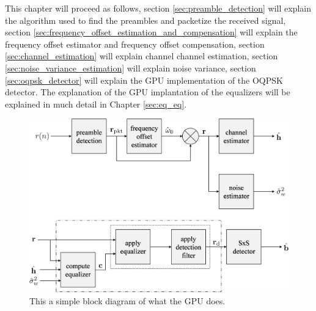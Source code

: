 This chapter will proceed as follows, 
section \ref{sec:preamble_detection} will explain the algorithm used to find the preambles and packetize the received signal,
section \ref{sec:frequency_offset_estimation_and_compensation} will explain the frequency offset estimator and frequency offset compensation,
section \ref{sec:channel_estimation} will explain channel channel estimation,
section \ref{sec:noise_variance_estimation} will explain noise variance,
section \ref{sec:oqpsk_detector} will explain the GPU implementation of the OQPSK detector.
The explanation of the GPU implantation of the equalizers will be explained in much detail in Chapter \ref{sec:eq_eq}.
\begin{figure}
	\centering\includegraphics[width=6in]{figures/systemOverview/blockDiagram.pdf}
	\caption{This a simple block diagram of what the GPU does.}
	\label{fig:simpleBlockDiagram}
\end{figure}



















